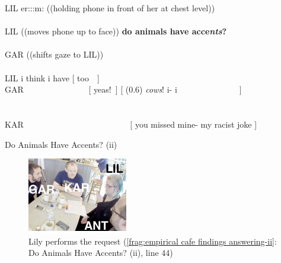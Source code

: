 \begin{revisedsubmission}
\begin{inlinefrag}
    {
    \begin{transcript}[40]
        \by LIL {er:::m: ((holding phone in front of her at chest level))} \\
         \\
        \by LIL {((moves phone up to face)) \textbf{do animals have acce\emph{nts}?}} \\
         \\
        \by GAR {((shifts gaze to LIL))} \\
         \\
        \by LIL {i think i have [ too\intDown{}~~]} \\
        \by GAR {~~~~~~~~~~~~~~~[ yeas!~] [ (0.6) \emph{cows}! i- i~~~~~~~~~~~~~~~]} \\
         \\
         \\
        \by KAR {~~~~~~~~~~~~~~~~~~~~~~~~~[ you missed mine- my racist joke ]} \\
    \end{transcript}
    \caption{Do Animals Have Accents? (ii)}\label{frag:empirical cafe findings answering-ii}
    \begin{figure}[bth]
        \centering
            \includegraphics[width=.5\linewidth]{Graphics/3-2-Empirical-Cafe/FragmentAnimals-2}%
        \caption{Lily performs the request (\autoref{frag:empirical cafe findings answering-ii}: Do Animals Have Accents? (ii), line 44)}\label{fig:empirical cafe findings answering-ii}
    \end{figure}
    }
\end{inlinefrag}


\end{revisedsubmission}
